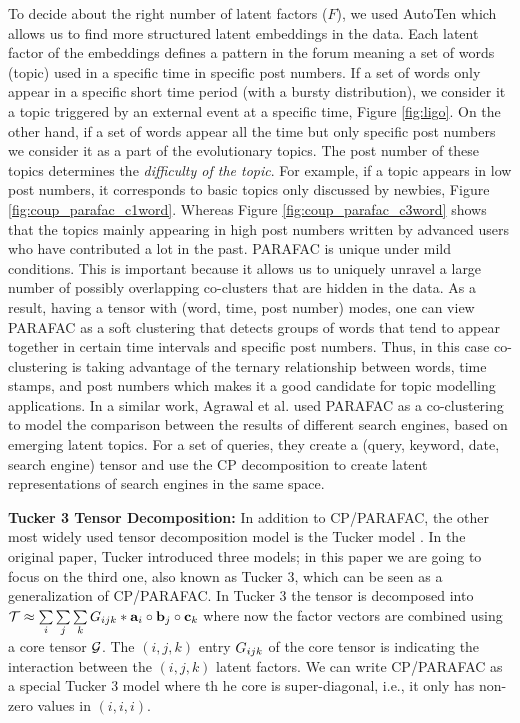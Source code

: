 To decide about the right number of latent factors ($F$), we used AutoTen \cite{papalexakis2016automatic} which allows us to find more structured latent embeddings in the data. 
Each latent factor of the embeddings defines a pattern in the forum meaning a set of words (topic) used in a specific time in specific post numbers. If a set of words only appear in a specific short time period (with a bursty distribution), we consider it a topic triggered by an external event at a specific time, Figure \ref{fig:ligo}. On the other hand, if a set of words appear all the time but only specific post numbers we consider it as a part of the evolutionary topics. The post number of these topics determines the {\em difficulty of the topic}. For example, if a topic appears in low post numbers, it corresponds to basic topics only discussed by newbies, Figure \ref{fig:coup_parafac_c1word}.  Whereas  Figure \ref{fig:coup_parafac_c3word} shows that the topics mainly appearing in  high post numbers written by advanced users who have contributed a lot in the past.
PARAFAC is unique under mild conditions.  This is important because it allows us to uniquely unravel a
large number of possibly overlapping co-clusters that are hidden in the data. As a result, having a tensor with (word, time, post number) modes, one can view  PARAFAC as a soft clustering that detects  groups of words that tend to appear together in certain time intervals and specific post numbers. Thus, in this case co-clustering  is taking advantage of the ternary relationship between words, time stamps, and post numbers which makes it a good candidate for topic modelling applications. 
In a similar work, Agrawal et al. \cite{Agrawal:2017:HWS, Agrawal:2015:OGB:2817946.2820604, Agrawal:2015:SDW:2740908.2743060, Agrawal:2015:WSN:2783258.2788571}  used PARAFAC as a co-clustering to model the comparison between the results of different search engines, based on emerging latent topics.  For a set of queries, they create a (query, keyword, date, search engine) tensor and use the CP decomposition to create latent representations of search engines in the same space.

\textbf{Tucker 3 Tensor Decomposition:}
In addition to CP/PARAFAC, the other most widely used tensor decomposition model is the Tucker model \cite{tucker1966some}. In the original paper, Tucker introduced three models; in this paper we are going to focus on the third one, also known as Tucker 3, which can be seen as a generalization of CP/PARAFAC. In Tucker 3 the tensor is decomposed into
$ \footnotesize
{\ensuremath{\mathbf{\mathcal{T}}}} \approx \sum\limits_{i} \sum\limits_{j} \sum\limits_{k}  {G}_{ijk} * \mathbf{a}_i \circ \mathbf{b}_j  \circ \mathbf{c}_k   
$
 where now the factor vectors are combined using a core tensor ${\mathbf{\mathcal{G}}}$. The $(i,j,k)$ entry ${G}_{ijk}$ of the core tensor is indicating the interaction between the $(i,j,k)$ latent factors. We can write CP/PARAFAC as a special Tucker 3 model where th he core is super-diagonal, i.e., it only has non-zero values in $(i,i,i)$.

